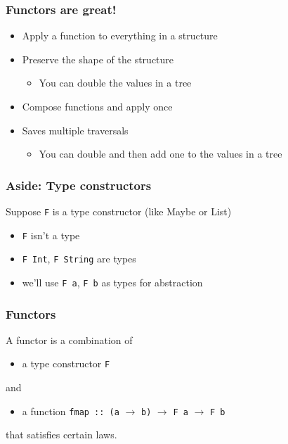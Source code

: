 \documentclass{beamer}
\begin{document}
\begin{frame}
    \frametitle {Functors are great!}
\begin{itemize}
\item Apply a function to everything in a structure
\item Preserve the shape of the structure
\begin{itemize}
    \item You can double the values in a tree
\end{itemize}
\item Compose functions and apply once 
\item Saves multiple traversals
\begin{itemize}
    \item You can double and then add one to the values in a tree
\end{itemize}
\end{itemize}
\end{frame}

\begin{frame}[fragile]
    \frametitle {Aside: Type constructors}

Suppose \verb?F? is a type constructor (like Maybe or List)
\begin{itemize}
\item \Verb?F? isn't a type
\item \Verb?F Int?, \Verb?F String? are types
\item we'll use \Verb?F a?, \Verb?F b? as types for abstraction
\end{itemize}

\end{frame}

\begin{frame}[fragile]
    \frametitle {Functors}
A functor is a combination of 
\begin{itemize}
\item a type constructor \verb?F? 
\end{itemize}
and 
\begin{itemize}
\item a function \verb?fmap :: (a? $\rightarrow$ \verb?b)? $\rightarrow$ \verb?F a? $\rightarrow$ \verb?F b?
\end{itemize}
that satisfies certain laws.

\end{frame}
\end{document}
